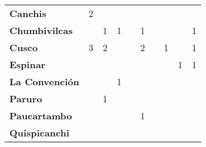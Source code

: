 \begin{tabular}{lccccccccc}
	\textbf{Canchis}                            
	&2         									&\cellcolor[HTML]{FCC46C}                	&\cellcolor[HTML]{FCC46C}              		&\cellcolor[HTML]{FCC46C} 		  			&\cellcolor[HTML]{FCC46C} 
	&\cellcolor[HTML]{FCC46C}   				&\cellcolor[HTML]{FCC46C} 							&\cellcolor[HTML]{FCC46C}					&\cellcolor[HTML]{FCC46C}\\
	\textbf{Chumbivilcas}                      
	&\cellcolor[HTML]{FCC46C}                   &1                  &1                  						&\cellcolor[HTML]{FCC46C}       			&1
	&\cellcolor[HTML]{FCC46C}   			    &\cellcolor[HTML]{FCC46C}
	&\cellcolor[HTML]{FCC46C}					&1\\
	\textbf{Cusco}                             
	&3                    			&2                  
	&\cellcolor[HTML]{FCC46C}                   &\cellcolor[HTML]{FCC46C}    	 
	&2 											&\cellcolor[HTML]{FCC46C} 		 
	&1											&\cellcolor[HTML]{FCC46C}
	&1\\
	\textbf{Espinar}       					                 						   
	&\cellcolor[HTML]{FCC46C}        			&\cellcolor[HTML]{FCC46C}                   &\cellcolor[HTML]{FCC46C}                   &\cellcolor[HTML]{FCC46C}  		 			&\cellcolor[HTML]{FCC46C} 
	&\cellcolor[HTML]{FCC46C} 					&\cellcolor[HTML]{FCC46C} 		 
	&1											&1\\
	\textbf{La Convención}                      &\cellcolor[HTML]{FCC46C}                   &\cellcolor[HTML]{FCC46C}                   &1                   						&\cellcolor[HTML]{FCC46C}              		&\cellcolor[HTML]{FCC46C} 					&\cellcolor[HTML]{FCC46C}
	&\cellcolor[HTML]{FCC46C}  					&\cellcolor[HTML]{FCC46C} 		
	&\cellcolor[HTML]{FCC46C} 					\\
	\textbf{Paruro}                            
	&\cellcolor[HTML]{FCC46C}              	    &1                   
	&\cellcolor[HTML]{FCC46C}              	    &\cellcolor[HTML]{FCC46C}        
	&\cellcolor[HTML]{FCC46C}                   &\cellcolor[HTML]{FCC46C}   				
	&\cellcolor[HTML]{FCC46C} 					&\cellcolor[HTML]{FCC46C}		 
	&\cellcolor[HTML]{FCC46C}\\
	\textbf{Paucartambo}               		    &\cellcolor[HTML]{FCC46C}                     
	&\cellcolor[HTML]{FCC46C}       &\cellcolor[HTML]{FCC46C}                      
	&\cellcolor[HTML]{FCC46C}                   &1
	&\cellcolor[HTML]{FCC46C} 					&\cellcolor[HTML]{FCC46C}		&\cellcolor[HTML]{FCC46C}					&\cellcolor[HTML]{FCC46C}\\
	\textbf{Quispicanchi}                                         
	&\cellcolor[HTML]{FCC46C}                   &\cellcolor[HTML]{FCC46C}                  

\end{tabular}
